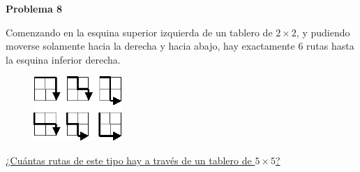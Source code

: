 \begin{center}
\Large \textbf{Problema 8}
\end{center}

Comenzando en la esquina superior izquierda de un tablero de $2 \times 2$, y pudiendo moverse solamente hacia la derecha y hacia abajo,
hay exactamente $6$ rutas hasta la esquina inferior derecha.

\begin{figure}[H]
    \centering
    \includegraphics[width=0.3\textwidth]{caminos_grilla.png}
\end{figure}

\underline{¿Cuántas rutas de este tipo hay a través de un tablero de $5 \times 5$?}

